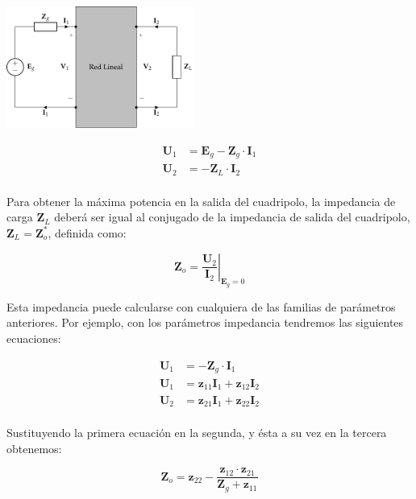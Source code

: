 \documentclass[10pt]{article}
\begin{document}
\begin{minipage}{0.5\textwidth}
  \begin{center}
    \includegraphics[height=4cm]{../figs/cuadripolo_cargado_fuente_tension.pdf}
  \end{center}
\end{minipage}
\begin{minipage}{0.5\textwidth}
  \begin{align*}
    \mathbf{U}_1 &= \mathbf{E}_g - \mathbf{Z}_g \cdot \mathbf{I}_1\\
    \mathbf{U}_2 &= - \mathbf{Z}_L \cdot \mathbf{I}_2\\
  \end{align*}
\end{minipage}

\vspace{1cm}

Para obtener la máxima potencia en la salida del cuadripolo, la impedancia de carga $\mathbf{Z}_L$ deberá ser igual al conjugado de la impedancia de salida del cuadripolo, $\mathbf{Z}_L = \mathbf{Z}^*_o$, definida como:

\[
  \mathbf{Z}_o = \left.\dfrac{\mathbf{U}_2}{\mathbf{I}_2}\right\rvert_{\mathbf{E}_g = 0}
\]

Esta impedancia puede calcularse con cualquiera de las familias de parámetros anteriores. Por ejemplo, con los parámetros impedancia tendremos las siguientes ecuaciones:

\begin{align*}
  \mathbf{U}_1 &= - \mathbf{Z}_g \cdot \mathbf{I}_1\\
  \mathbf{U}_1 &= \mathbf{z}_{11} \mathbf{I}_1 + \mathbf{z}_{12} \mathbf{I}_2\\
  \mathbf{U}_2 &= \mathbf{z}_{21} \mathbf{I}_1 + \mathbf{z}_{22} \mathbf{I}_2\\
\end{align*}

Sustituyendo la primera ecuación en la segunda, y ésta a su vez en la tercera obtenemos:

\begin{equation*}
  \mathbf{Z}_o = \mathbf{z}_{22} - \dfrac{\mathbf{z}_{12} \cdot \mathbf{z}_{21}}{\mathbf{Z}_g + \mathbf{z}_{11}}
\end{equation*}
\end{document}
